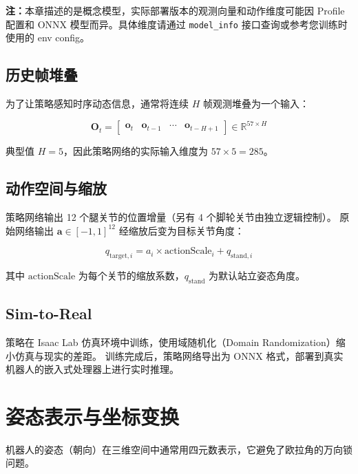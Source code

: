 \documentclass[a4paper,11pt,openany]{book}
\begin{document}
\textbf{注：}本章描述的是概念模型，实际部署版本的观测向量和动作维度可能因 Profile 配置和 ONNX 模型而异。具体维度请通过 \texttt{model\_info} 接口查询或参考您训练时使用的 env config。

\subsection{历史帧堆叠}

为了让策略感知时序动态信息，通常将连续 $H$ 帧观测堆叠为一个输入：

\begin{equation}
\mathbf{O}_t = \begin{bmatrix}
  \mathbf{o}_t & \mathbf{o}_{t-1} & \cdots & \mathbf{o}_{t-H+1}
\end{bmatrix}
\in \mathbb{R}^{57 \times H}
\end{equation}

典型值 $H = 5$，因此策略网络的实际输入维度为 $57 \times 5 = 285$。

\subsection{动作空间与缩放}

策略网络输出 12 个腿关节的位置增量（另有 4 个脚轮关节由独立逻辑控制）。
原始网络输出 $\mathbf{a} \in [-1, 1]^{12}$ 经缩放后变为目标关节角度：

\begin{equation}
\label{eq:action-scale}
q_{\mathrm{target},i} = a_i \times \mathrm{actionScale}_i + q_{\mathrm{stand},i}
\end{equation}

其中 $\mathrm{actionScale}$ 为每个关节的缩放系数，$q_{\mathrm{stand}}$ 为默认站立姿态角度。

\subsection{Sim-to-Real}

策略在 Isaac Lab 仿真环境中训练，使用域随机化（Domain Randomization）缩小仿真与现实的差距。
训练完成后，策略网络导出为 ONNX 格式，部署到真实机器人的嵌入式处理器上进行实时推理。

\section{姿态表示与坐标变换}
\label{sec:attitude}

机器人的姿态（朝向）在三维空间中通常用四元数表示，它避免了欧拉角的万向锁问题。
\end{document}
